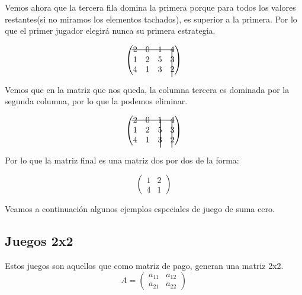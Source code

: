 \documentclass[10pt,a4paper]{book}
\begin{document}
Vemos ahora que la tercera fila domina la primera porque para todos los valores restantes(si no miramos los elementos tachados), es superior a la primera. Por lo que el primer jugador elegirá nunca su primera estrategia.

\begin{equation}
	\begin{pmatrix}
		2 & 0 & 1 & 4\\
		1 & 2 & 5 & 3\\
		4 & 1 & 3 & 2
		\makebox(-6,0){\rule[5ex]{.8pt}{8ex}} %
		\makebox(-52,2){\rule[12ex]{12ex}{.5pt}} %
	\end{pmatrix}
\end{equation}

Vemos que en la matriz que nos queda, la columna tercera es dominada por la segunda columna, por lo que la podemos eliminar.


\begin{equation}
	\begin{pmatrix}
		2 & 0 & 1 & 4\\
		1 & 2 & 5 & 3\\
		4 & 1 & 3 & 2
		\makebox(-6,0){\rule[5ex]{.8pt}{8ex}} %
		\makebox(-52,2){\rule[12ex]{12ex}{.5pt}} %
		\makebox(-34,0){\rule[5ex]{.8pt}{8ex}} %
	\end{pmatrix}
\end{equation}

Por lo que la matriz final es una matriz dos por dos de la forma:

\begin{equation}
	\begin{pmatrix}
		1 & 2 \\
		4 & 1 
	\end{pmatrix}
\end{equation}


Veamos a continuación algunos ejemplos especiales de juego de suma cero.\\

\subsection{Juegos 2x2}

Estos juegos son aquellos que como matriz de pago, generan una matriz 2x2.\\


\begin{equation}
A=	\begin{pmatrix}
		a_{11} & a_{12} \\
		a_{21} & a_{22}
	\end{pmatrix}
\end{equation}
\end{document}
